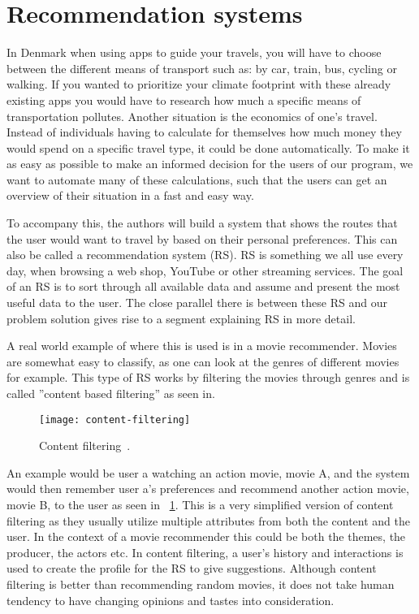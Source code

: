 \section{Recommendation systems}\label{sec:recommendation-systems}

In Denmark when using apps to guide your travels, you will have to choose between the different means of transport such
as: by car, train, bus, cycling or walking.
If you wanted to prioritize your climate footprint with these already existing apps you would have to research how much
a specific means of transportation pollutes.
Another situation is the economics of one's travel.
Instead of individuals having to calculate for themselves how much money they would spend on a specific travel type,
it could be done automatically.
To make it as easy as possible to make an informed decision for the users of our program, we want to automate many of
these calculations, such that the users can get an overview of their situation in a fast and easy way.

To accompany this, the authors will build a system that shows the routes that the user would want to travel by based on
their personal preferences.
This can also be called a recommendation system (RS).
RS is something we all use every day, when browsing a web shop, YouTube or other streaming services.
The goal of an RS is to sort through all available data and assume and present the most useful data to the user.
The close parallel there is between these RS and our problem solution gives rise to a segment explaining RS in more
detail.

A real world example of where this is used is in a movie recommender.
Movies are somewhat easy to classify, as one can look at the genres of different movies for example.
This type of RS works by filtering the movies through genres and is called ''content based filtering'' as seen in.

\begin{figure}
    \centering
    \texttt{[image: content-filtering]}
    \caption{Content filtering~\cite{content_based_filtering}.}
    \label{fig:figure3}
\end{figure}

An example would be user a watching an action movie, movie A, and the system would then remember user a's preferences
and recommend another action movie, movie B, to the user as seen in ~\ref{fig:figure3}.
This is a very simplified version of content filtering as they usually utilize multiple attributes from both the content
and the user.
In the context of a movie recommender this could be both the themes, the producer, the actors etc.
In content filtering, a user's history and interactions is used to create the profile for the RS to give suggestions.
Although content filtering is better than recommending random movies, it does not take human tendency to have changing
opinions and tastes into consideration.

